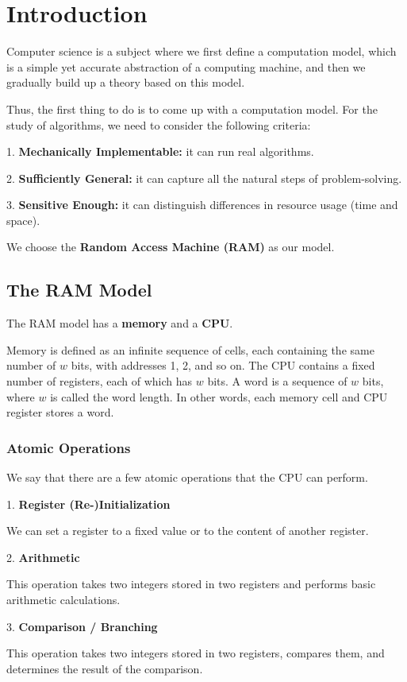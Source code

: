 \chapter{Introduction}

Computer science is a subject where we first define a computation model, which is a simple yet accurate abstraction of a computing machine, and then we gradually build up a theory based on this model. 

Thus, the first thing to do is to come up with a computation model. For the study of algorithms, we need to consider the following criteria: 

1. \textbf{Mechanically Implementable:} it can run real algorithms.

2. \textbf{Sufficiently General:} it can capture all the natural steps of problem-solving.

3. \textbf{Sensitive Enough:} it can distinguish differences in resource usage (time and space).

We choose the \textbf{Random Access Machine (RAM)} as our model.

\section{The RAM Model}
The RAM model has a \textbf{memory} and a \textbf{CPU}. 

Memory is defined as an infinite sequence of cells, each containing the same number of \(w\) bits, with addresses 1, 2, and so on. The CPU contains a fixed number of registers, each of which has \(w\) bits. A word is a sequence of \(w\) bits, where \(w\) is called the word length. In other words, each memory cell and CPU register stores a word. 

\subsection{Atomic Operations}
We say that there are a few atomic operations that the CPU can perform. 

1. \textbf{Register (Re-)Initialization} 

We can set a register to a fixed value or to the content of another register. 

2. \textbf{Arithmetic} 

This operation takes two integers stored in two registers and performs basic arithmetic calculations. 

3. \textbf{Comparison / Branching}

This operation takes two integers stored in two registers, compares them, and determines the result of the comparison.

